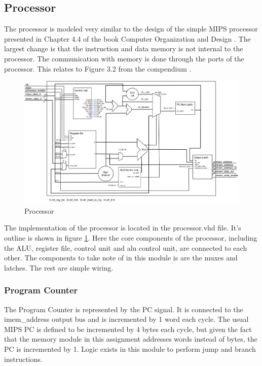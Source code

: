 \subsection{Processor}

The processor is modeled very similar to the design of the simple MIPS processor 
presented in Chapter 4.4 of the book Computer Organization and Design \cite{curriculum}. 
The largest change is that the instruction and data memory is not internal to the processor.
 The communication with memory is done through the ports of the processor. This relates to 
Figure 3.2 from the compendium \cite{compendium}. 

\begin{figure}[h]
	\centerline{\includegraphics[width=550px]{figures/processor.png}}
	\caption{Processor}
	\label{fig:processor}
\end{figure}

The implementation of the processor is located in the processor.vhd file. It's outline is 
shown in figure \ref{fig:processor}. Here the core 
components of the processor, including the ALU, register file, control unit and alu control 
unit, are connected to each other. The components to take note of in this module is are 
the muxes and latches. The rest are simple wiring. 

\subsubsection{Program Counter}
The Program Counter is represented by the PC signal. It is connected to the imem\_address 
output bus and is incremented by 1 word each cycle. The usual MIPS PC is defined to be 
incremented by 4 bytes each cycle, but given the fact that the memory module in this 
assignment addresses words instead of bytes, the PC is incremented by 1. Logic exists 
in this module to perform jump and branch instructions. 

